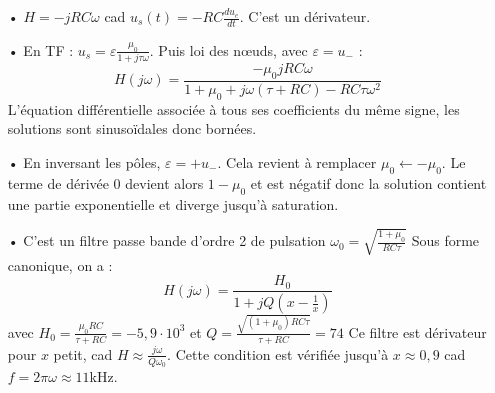 \documentclass{report}
\begin{document}
\begin{itemize}
	\item[•] $H = -jRC\omega$ cad $u_s(t) = -RC\frac{du_e}{dt}$. C'est un dérivateur.
	\item[•] En TF : $u_s = \varepsilon\frac{\mu_0}{1+j\tau\omega}$. Puis loi des nœuds, avec $\varepsilon=u_-$ :
	\begin{equation}
		H(j\omega) = \frac{-\mu_0jRC\omega}{1+\mu_0 + j\omega(\tau+RC)-RC\tau\omega^2}
	\end{equation}
	L'équation différentielle associée à tous ses coefficients du même signe, les solutions sont sinusoïdales donc bornées. 
	\item[•] En inversant les pôles, $\varepsilon=+u_-$. Cela revient à remplacer $\mu_0\leftarrow-\mu_0$. Le terme de dérivée 0 devient alors $1-\mu_0$ et est négatif donc la solution contient une partie exponentielle et diverge jusqu'à saturation.
	\item[•] C'est un filtre passe bande d'ordre 2 de pulsation $\omega_0=\sqrt{\frac{1+\mu_0}{RC\tau}}$
	Sous forme canonique, on a :
		\begin{equation}
		H(j\omega) = \frac{H_0}{1+jQ(x-\frac{1}{x})}
	\end{equation}
	avec $H_0=\frac{\mu_0RC}{\tau+RC}=-5,9\cdot10^3$ et $Q = \frac{\sqrt{(1+\mu_0)RC\tau}}{\tau+RC}=74$
	Ce filtre est dérivateur pour $x$ petit, cad $H\approx \frac{j\omega}{Q\omega_0}$. Cette condition est vérifiée jusqu'à $x\approx0,9$ cad $f=2\pi\omega\approx11$kHz.
\end{itemize}
\end{document}
